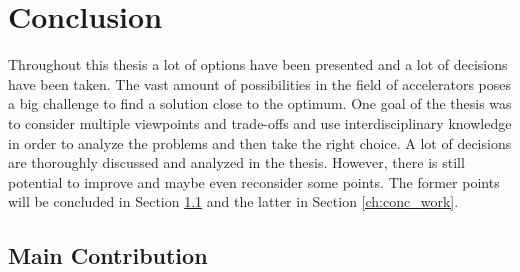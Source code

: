 \documentclass[mscthesis]{usiinfthesis}
\begin{document}
\chapter{Conclusion}
\label{ch:conc}
\glsresetall %

Throughout this thesis a lot of options have been presented and a lot of
decisions have been taken. The vast amount of possibilities in the field of
accelerators poses a big challenge to find a solution close to the optimum.
One goal of the thesis was to consider multiple viewpoints and trade-offs and
use interdisciplinary knowledge in order to analyze the problems and then take
the right choice. A lot of decisions are thoroughly discussed and analyzed in
the thesis. However, there is still potential to improve and maybe even
reconsider some points. The former points will be concluded in Section
\ref{ch:conc_ach} and the latter in Section \ref{ch:conc_work}.

\section{Main Contribution}
\label{ch:conc_ach}
\end{document}
